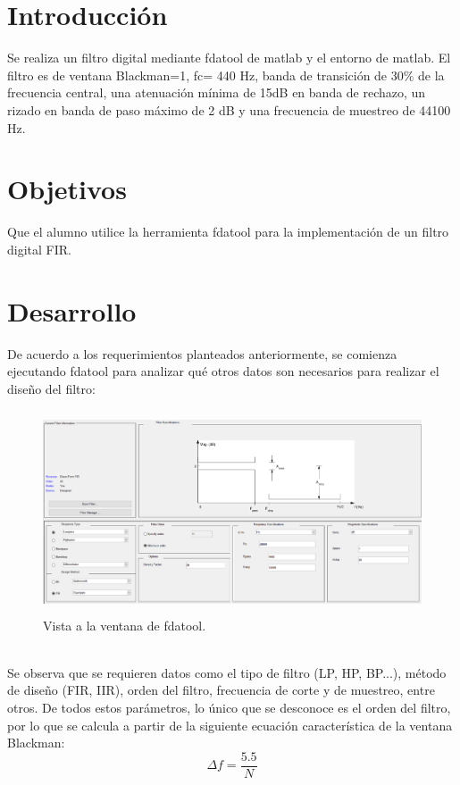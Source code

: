 \documentclass[12pt]{article}
\begin{document}

\newpage

\section{Introducción}
Se realiza un filtro digital mediante fdatool de matlab y el entorno de matlab. El filtro es de ventana Blackman=1, fc= 440 Hz, banda  de  transición  de 30\%  de  la  frecuencia central, una atenuación mínima de 15dB en banda de rechazo, un rizado en banda de paso máximo de 2 dB y una frecuencia de muestreo de 44100 Hz.

\section{Objetivos}
Que el alumno utilice la herramienta fdatool para la implementación de un filtro digital FIR.
\section{Desarrollo}
De acuerdo a los requerimientos planteados anteriormente, se comienza ejecutando fdatool para analizar qué otros datos son necesarios para realizar el diseño del filtro: 
\\
  \begin{figure}[h]
        \centering
        \includegraphics[width=14cm, height=6cm]{imagenes/fdatool.png}
        \caption{Vista a la ventana de fdatool.}
    \end{figure}
    \\
Se observa que se requieren datos como el tipo de filtro (LP, HP, BP...), método de diseño (FIR, IIR), orden del filtro, frecuencia de corte y de muestreo, entre otros. De todos estos parámetros, lo único que se desconoce es el orden del filtro, por lo que se calcula a partir de la siguiente ecuación característica de la ventana Blackman:
\begin{equation}
    \Delta f = \dfrac{5.5}{N}
\end{equation}
\end{document}
